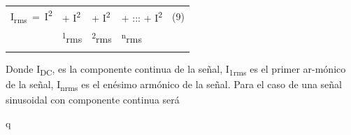 \documentclass[12pt]{article}
\begin{document}
\begin{table}[H]
 			\centering
\begin{tabular}{p{0.65in}p{0.29in}p{0.27in}p{1.02in}p{0.44in}}
\multicolumn{1}{p{0.65in}}{{\fontsize{8pt}{9.6pt}\selectfont I\textsubscript{rms}\ =\   I\textsuperscript{2}}} & 
\multicolumn{1}{p{0.29in}}{{\fontsize{8pt}{9.6pt}\selectfont + I\textsuperscript{2}}} & 
\multicolumn{1}{p{0.27in}}{{\fontsize{8pt}{9.6pt}\selectfont + I\textsuperscript{2}}} & 
\multicolumn{1}{p{1.02in}}{{\fontsize{8pt}{9.6pt}\selectfont + ::: + I\textsuperscript{2}}} & 
\multicolumn{1}{p{0.44in}}{(9)} \\
\hhline{~~~~~}
\multicolumn{1}{p{0.65in}}{{\fontsize{7pt}{8.4pt}\selectfont DC}} & 
\multicolumn{1}{p{0.29in}}{\textsuperscript{1}{\fontsize{5pt}{6.0pt}\selectfont rms}} & 
\multicolumn{1}{p{0.27in}}{\textsuperscript{2}{\fontsize{5pt}{6.0pt}\selectfont rms}} & 
\multicolumn{1}{p{1.02in}}{\textsuperscript{n}{\fontsize{5pt}{6.0pt}\selectfont rms}} & 
\multicolumn{1}{p{0.44in}}{} \\
\hhline{~~~~~}

\end{tabular}
 \end{table}



\begin{adjustwidth}{0.86in}{0.88in}
\begin{justify}
Donde I\textsubscript{DC}, es la componente continua de la señal, I\textsubscript{1rms} es el primer ar-mónico de la señal, I\textsubscript{nrms} es el enésimo armónico de la señal. Para el caso de una señal sinusoidal con componente continua será
\end{justify}\par

\end{adjustwidth}


\vspace{\baselineskip}
\begin{adjustwidth}{0.0in}{0.24in}
\begin{Center}
q
\end{Center}\par

\end{adjustwidth}
\end{document}

